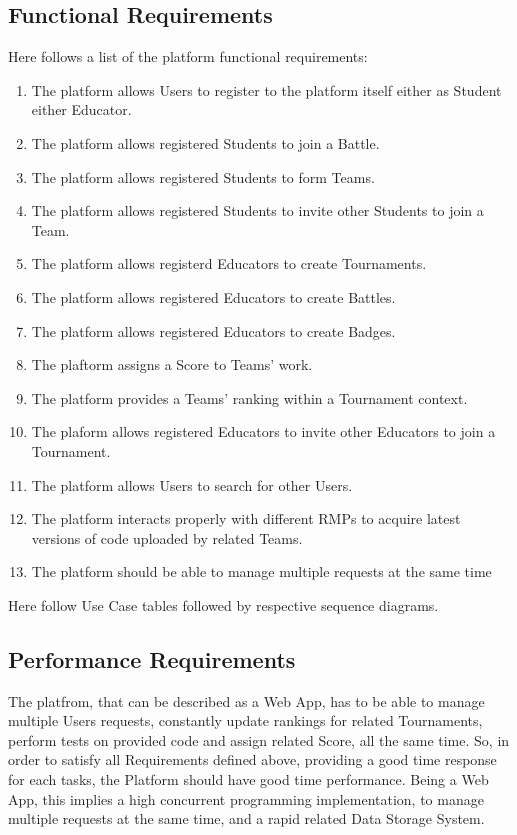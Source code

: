 \subsection{Functional Requirements}
Here follows a list of the platform functional requirements:
\begin{enumerate}[label=$\bullet$ \textbf{R\arabic*:}]
    \item The platform allows Users to register to the platform itself either as Student either Educator.
    \item The platform allows registered Students to join a Battle.
    \item The platform allows registered Students to form Teams.
    \item The platform allows registered Students to invite other Students to join a Team.
    \item The platform allows registerd Educators to create Tournaments.
    \item The platform allows registered Educators to create Battles.
    \item The platform allows registered Educators to create Badges.
    \item The plaftorm assigns a Score to Teams' work.
    \item The platform provides a Teams' ranking within a Tournament context.
    \item The plaform allows registered Educators to invite other Educators to join a Tournament.
    \item The platform allows Users to search for other Users.
    \item The platform interacts properly with different RMPs to acquire latest versions of code uploaded by related Teams. 
    \item The platform should be able to manage multiple requests at the same time
\end{enumerate}
Here follow Use Case tables followed by respective sequence diagrams.

\subsection{Performance Requirements}
The platfrom, that can be described as a Web App, has to be able to manage multiple Users requests, constantly update rankings for related Tournaments, perform tests on provided code and assign related Score, all the same time. So, in order to satisfy all Requirements defined above, providing a good time response for each tasks, the Platform should have good time performance. Being a Web App, this implies a high concurrent programming implementation, to manage multiple requests at the same time, and a rapid related Data Storage System. 
